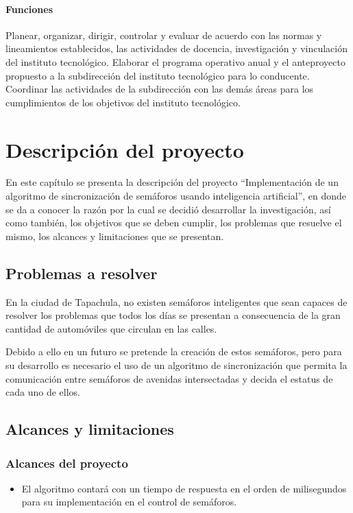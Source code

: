 \subsubsection*{Funciones}

Planear, organizar, dirigir, controlar y evaluar de acuerdo con las normas y lineamientos establecidos, las actividades de docencia, investigación y vinculación del instituto tecnológico. Elaborar el programa operativo anual y el anteproyecto propuesto a la subdirección del instituto tecnológico para lo conducente. Coordinar las actividades de la subdirección con las demás áreas para los cumplimientos de los objetivos del instituto tecnológico.


\chapter{Descripción del proyecto}
En este capítulo se presenta la descripción del proyecto “Implementación de un algoritmo de sincronización de semáforos usando inteligencia artificial”, en donde se da a conocer la razón por la cual se decidió desarrollar la investigación, así como también, los objetivos que se deben cumplir, los problemas que resuelve el mismo, los alcances y limitaciones que se presentan.

\section{Problemas a resolver}
En la ciudad de Tapachula, no existen semáforos inteligentes que sean capaces de resolver los problemas que todos los días se presentan a consecuencia de la gran cantidad de automóviles que circulan en las calles.

Debido a ello en un futuro se pretende la creación de estos semáforos, pero para su desarrollo es necesario el uso de un algoritmo de sincronización que permita la comunicación entre semáforos de avenidas intersectadas y decida el estatus de cada uno de ellos.

\section{Alcances y limitaciones}
\subsection*{Alcances del proyecto}
\begin{itemize}
\item El algoritmo contará con un tiempo de respuesta en el orden de milisegundos para su implementación en el control de semáforos.
\end{itemize}

